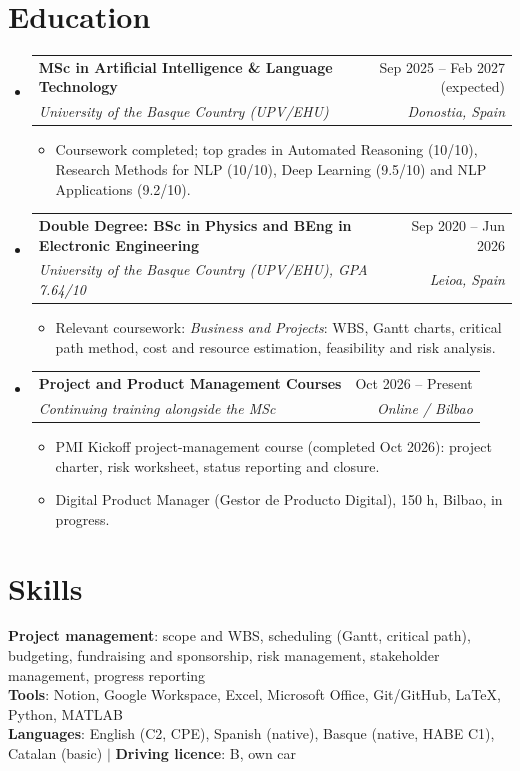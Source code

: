 \documentclass[a4paper,10pt]{article}
\makeatletter
\newcommand{\resumeItem}[1]{\item\small{{#1 \vspace{-2.5pt}}}}
\newcommand{\resumeSubheading}[4]{
  \vspace{3pt}\item
    \begin{tabular*}{\textwidth}[t]{l@{\extracolsep{\fill}}r}
      \textbf{#1} & \small #2 \\
      \textit{\small#3} & \textit{\small #4} \\
    \end{tabular*}\vspace{-6pt}
}
\newcommand{\resumeSubHeadingListStart}{\begin{itemize}[leftmargin=0.0in, label={}]}
\newcommand{\resumeSubHeadingListEnd}{\end{itemize}\vspace{-2pt}}
\newcommand{\resumeItemListStart}{\begin{itemize}[leftmargin=0.18in, topsep=2pt]}
\newcommand{\resumeItemListEnd}{\end{itemize}\vspace{-3pt}}
\makeatother
\begin{document}
\section{Education}
  \resumeSubHeadingListStart
    \resumeSubheading
      {MSc in Artificial Intelligence \& Language Technology}{Sep 2025 -- Feb 2027 (expected)}
      {University of the Basque Country (UPV/EHU)}{Donostia, Spain}
      \resumeItemListStart
        \resumeItem{Coursework completed; top grades in Automated Reasoning (10/10), Research Methods for NLP (10/10), Deep Learning (9.5/10) and NLP Applications (9.2/10).}
      \resumeItemListEnd
    \resumeSubheading
      {Double Degree: BSc in Physics and BEng in Electronic Engineering}{Sep 2020 -- Jun 2026}
      {University of the Basque Country (UPV/EHU), GPA 7.64/10}{Leioa, Spain}
      \resumeItemListStart
        \resumeItem{Relevant coursework: \textit{Business and Projects}: WBS, Gantt charts, critical path method, cost and resource estimation, feasibility and risk analysis.}
      \resumeItemListEnd
    \resumeSubheading
      {Project and Product Management Courses}{Oct 2026 -- Present}
      {Continuing training alongside the MSc}{Online / Bilbao}
      \resumeItemListStart
        \resumeItem{PMI Kickoff project-management course (completed Oct 2026): project charter, risk worksheet, status reporting and closure.}
        \resumeItem{Digital Product Manager (Gestor de Producto Digital), 150 h, Bilbao, in progress.}
      \resumeItemListEnd
  \resumeSubHeadingListEnd

\section{Skills}
 \begin{itemize}[leftmargin=0in, label={}]
    \small{\item{
     \textbf{Project management}{: scope and WBS, scheduling (Gantt, critical path), budgeting, fundraising and sponsorship, risk management, stakeholder management, progress reporting} \\
     \textbf{Tools}{: Notion, Google Workspace, Excel, Microsoft Office, Git/GitHub, LaTeX, Python, MATLAB} \\
     \textbf{Languages}{: English (C2, CPE), Spanish (native), Basque (native, HABE C1), Catalan (basic)} $|$ \textbf{Driving licence}{: B, own car}
    }}
 \end{itemize}
\end{document}

